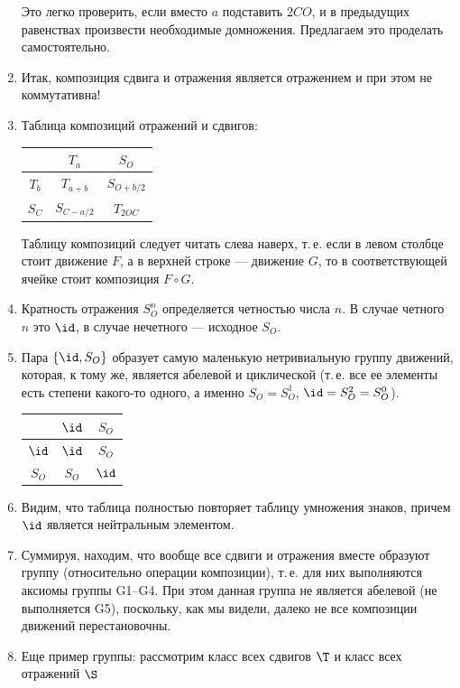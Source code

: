 \begin{enumerate}
Это легко проверить, если вместо $a$ подставить $2CO$, и в предыдущих равенствах произвести необходимые домножения. Предлагаем это проделать самостоятельно.
\item Итак, композиция сдвига и отражения является отражением и при этом не коммутативна!
\item Таблица композиций отражений и сдвигов:
\begin{center}
\begin{tabular}{c|c|c|}
  & $T_a$ & $S_O$ \\
 \hline
$T_b$ & $T_{a+b}$ & $S_{O+b/2}$ \\
 \hline
$S_C$ & $S_{C-a/2}$ & $T_{2OC}$ \\
\hline
\end{tabular}
\end{center}
Таблицу композиций следует читать слева наверх, т.\,е. если в левом столбце стоит движение $F$, а в верхней строке --- движение $G$, то в соответствующей ячейке стоит композиция $F\circ G$.
\item Кратность отражения $S_O^n$ определяется четностью числа $n$. В случае четного $n$ это $\id$, в случае нечетного --- исходное $S_O$.
\item Пара $\{\id, S_O\}$ образует самую маленькую нетривиальную группу движений, которая, к тому же, является абелевой и циклической (т.\,е. все ее элементы есть степени какого-то одного, а именно $S_O=S_O^1$, $\id=S_O^2=S_O^0$).
\begin{table}[htb!]\begin{center}
\begin{tabular}{c|c|c|}
  & $\id$ & $S_O$ \\
 \hline
$\id$ & $\id$ & $S_O$ \\
 \hline
$S_O$ & $S_O$ & $\id$ \\
\hline
\end{tabular}
\end{center}\end{table}
\item Видим, что таблица полностью повторяет таблицу умножения знаков, причем $\id$ является нейтральным элементом.
\item Суммируя, находим, что вообще все сдвиги и отражения вместе образуют группу (относительно операции композиции), т.\,е. для них выполняются аксиомы группы G1--G4. При этом данная группа не является абелевой (не выполняется G5), поскольку, как мы видели, далеко не все композиции движений перестановочны.
\item Еще пример группы: рассмотрим класс всех сдвигов $\T$ и класс всех отражений $\S$

\end{enumerate}
